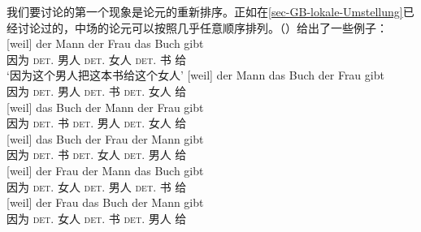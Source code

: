 我们要讨论的第一个现象是论元的重新排序。正如在\ref{sec-GB-lokale-Umstellung}已经讨论过的，中场的论元可以按照几乎任意顺序排列。（）给出了一些例子：
\eal
\label{bsp-GPSG-anordnung}
\ex 
\gll {}[weil] der Mann der Frau das Buch gibt\\
     {}\spacebr{}因为 \textsc{det}.\nom{} 男人 \textsc{det}.\dat{} 女人 \textsc{det}.\acc{} 书 给\\
\glt `因为这个男人把这本书给这个女人'
\ex 
\gll {}[weil] der Mann das Buch der Frau gibt\\
     {}\spacebr{}因为 \textsc{det}.\nom{} 男人 \textsc{det}.\acc{} 书 \textsc{det}.\dat{} 女人 给\\
\ex 
\gll {}[weil] das Buch der Mann der Frau gibt\\
{}\spacebr{}因为 \textsc{det}.\acc{} 书 \textsc{det}.\nom{} 男人 \textsc{det}.\dat{} 女人 给\\
\ex 
\gll {}[weil] das Buch der Frau der Mann gibt\\
{}\spacebr{}因为 \textsc{det}.\acc{} 书 \textsc{det}.\dat{} 女人 \textsc{det}.\nom{} 男人 给\\
\ex 
\gll {}[weil] der Frau der Mann das Buch gibt\\
{}\spacebr{}因为 \textsc{det}.\dat{} 女人 \textsc{det}.\nom{} 男人 \textsc{det}.\acc{} 书 给\\
\ex 
\gll {}[weil] der Frau das Buch der Mann gibt\\
{}\spacebr{}因为 \textsc{det}.\dat{} 女人 \textsc{det}.\acc{} 书 \textsc{det}.\nom{} 男人 给\\
\zl


